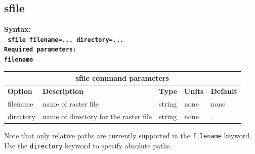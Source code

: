 \documentclass[11pt]{report}
\begin{document}
\subsection{sfile}
\label{keyword:sfile}
\begin{flushleft}\bf
Syntax:\\
\tt
sfile filename=... directory=...\\

\bf Required parameters:\\
\tt filename
\end{flushleft}
%
\begin{center}
\begin{tabular}{|l|p{8cm}|l|l||l|} \hline
\multicolumn{5}{|c|}{\bf sfile command parameters}\\ \hline
{\bf Option} & {\bf Description}                        & {\bf Type} & {\bf Units} & {\bf Default} \\ \hline 
\hline
filename      & name of raster file                     & string  & none & none \\ \hline
directory     & name of directory for the raster file   & string  & none & . \\ \hline
\end{tabular}
\end{center}
Note that only relative paths are currently supported in the \verb+filename+ keyword. Use the
\verb+directory+ keyword to specify absolute paths.


\end{document}
